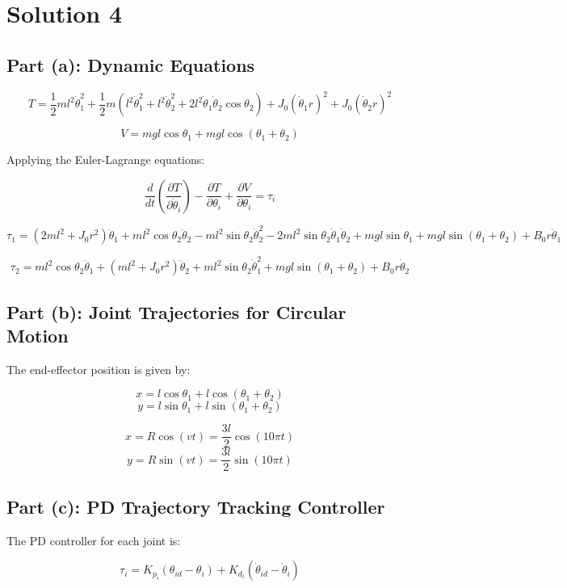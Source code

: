 \documentclass{article}
\begin{document}
\section*{Solution 4}

\subsection*{Part (a): Dynamic Equations}
\[
T = \frac{1}{2}m l^2 \dot{\theta}_1^2 + \frac{1}{2}m (l^2 \dot{\theta}_1^2 + l^2 \dot{\theta}_2^2 + 2l^2 \dot{\theta}_1 \dot{\theta}_2 \cos \theta_2) + J_0 (\dot{\theta}_1 r)^2 + J_0 (\dot{\theta}_2 r)^2
\]

\[
V = mgl\cos\theta_1 + mgl\cos(\theta_1 + \theta_2)
\]

Applying the Euler-Lagrange equations:

\[
\frac{d}{dt}\left(\frac{\partial T}{\partial \dot{\theta}_i}\right) - \frac{\partial T}{\partial \theta_i} + \frac{\partial V}{\partial \theta_i} = \tau_i
\]


\[
\tau_1 = (2ml^2 + J_0 r^2)\ddot{\theta}_1 + ml^2 \cos\theta_2 \ddot{\theta}_2 - ml^2 \sin\theta_2 \dot{\theta}_2^2 - 2ml^2 \sin\theta_2 \dot{\theta}_1 \dot{\theta}_2 + mgl\sin\theta_1 + mgl\sin(\theta_1 + \theta_2) + B_0 r \dot{\theta}_1
\]

\[
\tau_2 = ml^2 \cos\theta_2 \ddot{\theta}_1 + (ml^2 + J_0 r^2)\ddot{\theta}_2 + ml^2 \sin\theta_2 \dot{\theta}_1^2 + mgl\sin(\theta_1 + \theta_2) + B_0 r \dot{\theta}_2
\]

\subsection*{Part (b): Joint Trajectories for Circular Motion}

The end-effector position is given by:

\[
x = l\cos\theta_1 + l\cos(\theta_1 + \theta_2)
\]
\[
y = l\sin\theta_1 + l\sin(\theta_1 + \theta_2)
\]

\[
x = R\cos(vt) = \frac{3l}{2}\cos(10\pi t)
\]
\[
y = R\sin(vt) = \frac{3l}{2}\sin(10\pi t)
\]


\subsection*{Part (c): PD Trajectory Tracking Controller}

The PD controller for each joint is:

\[
\tau_i = K_{p_i} (\theta_{id} - \theta_i) + K_{d_i} (\dot{\theta}_{id} - \dot{\theta}_i)
\]
\end{document}
